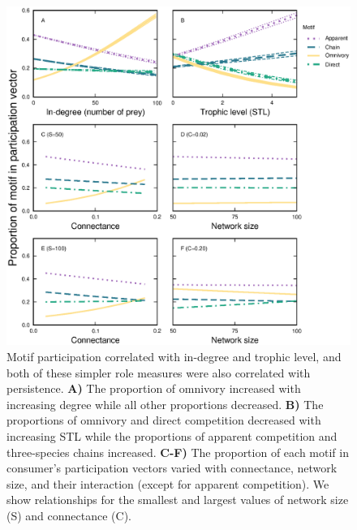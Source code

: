 \documentclass[12pt]{article}
\begin{document}
\begin{spacing}{2.0}
    \begin{figure}[hb!]
        \centering
        \includegraphics[width=\textwidth]{figures/roles_vs_TL.eps}
        \caption{Motif participation correlated with in-degree and trophic level, and both of these simpler role measures were also correlated with persistence. \textbf{A)} The proportion of omnivory increased with increasing degree while all other proportions decreased. \textbf{B)} The proportions of omnivory and direct competition decreased with increasing STL while the proportions of apparent competition and three-species chains increased. \textbf{C-F)} The proportion of each motif in consumer's participation vectors varied with connectance, network size, and their interaction (except for apparent competition). We show relationships for the smallest and largest values of network size (S) and connectance (C).
        }
        \label{fig:motifs_vs_TL_and_deg}
    \end{figure}        


\end{spacing}
\end{document}
